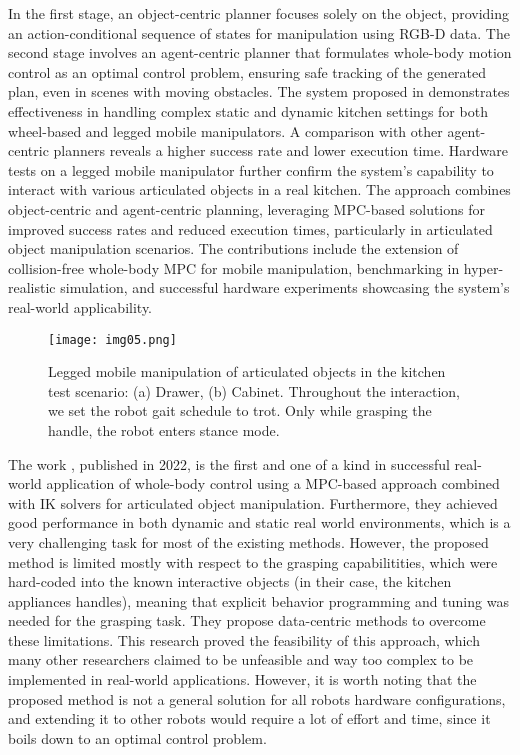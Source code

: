 In the first stage, an object-centric planner focuses solely on the object, providing an
action-conditional sequence of states for manipulation using RGB-D data.
The second stage involves an agent-centric planner that formulates whole-body motion control
as an optimal control problem, ensuring safe tracking of the generated plan, even in scenes
with moving obstacles.
The system proposed in \cite{mittal2022articulated} demonstrates effectiveness in handling complex static and
dynamic kitchen settings for both wheel-based and legged mobile manipulators. A comparison with
other agent-centric planners reveals a higher success rate and lower execution time. Hardware
tests on a legged mobile manipulator further confirm the system's capability to interact with
various articulated objects in a real kitchen. The approach combines object-centric and
agent-centric planning, leveraging MPC-based solutions for improved success rates and reduced
execution times, particularly in articulated object manipulation scenarios. The contributions
include the extension of collision-free whole-body MPC for mobile manipulation, benchmarking
in hyper-realistic simulation, and successful hardware experiments showcasing the system's
real-world applicability.


\begin{figure}[H]
	\centering
	\texttt{[image: img05.png]}
	\captionsetup{width=1\linewidth}
	\caption{Legged mobile manipulation of articulated objects in the kitchen test scenario:
		(a) Drawer, (b) Cabinet. Throughout the interaction, we set the robot gait schedule
		to trot. Only while grasping the handle, the robot enters stance mode.
		\cite{mittal2022articulated}}
	\label{fig:img05}
\end{figure}


The work \cite{mittal2022articulated}, published in 2022, is the first and one of a kind
in successful real-world application of whole-body control using a MPC-based approach
combined with IK solvers for articulated object manipulation.
Furthermore, they achieved good performance in both dynamic
and static real world environments, which is a very challenging task for most of the
existing methods. However, the proposed method is limited mostly with respect to the grasping
capabilitities, which were hard-coded into the known interactive objects (in their case,
the kitchen appliances handles), meaning that explicit behavior programming and tuning was
needed for the grasping task. They propose data-centric methods to overcome these limitations.
This research proved the feasibility of this approach, which many other researchers claimed
to be unfeasible and way too complex to be implemented in real-world applications. However,
it is worth noting that the proposed method is not a general solution for all robots hardware
configurations, and extending it to other robots would require a lot of effort and time,
since it boils down to an optimal control problem.

